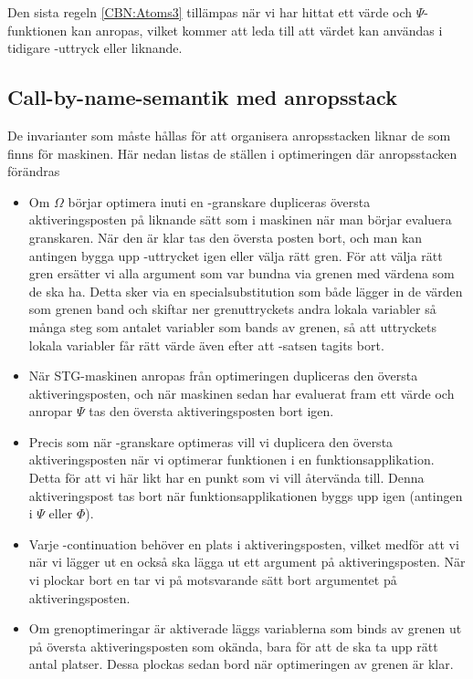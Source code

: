 \documentclass[../Optimise]{subfiles}
\begin{document}
Den sista regeln \eqref{CBN:Atoms3} tillämpas när vi har hittat ett värde och $\Psi$-funktionen kan anropas,
vilket kommer att leda till att värdet kan användas i tidigare -uttryck eller liknande.


\subsection{Call-by-name-semantik med anropsstack}


De invarianter som måste hållas för att organisera anropsstacken liknar de som finns
för maskinen. Här nedan listas de ställen i optimeringen där anropsstacken förändras



\begin{itemize}
\item
Om $\Omega$ börjar optimera inuti en -granskare dupliceras översta aktiveringsposten 
på liknande sätt som i maskinen när man börjar evaluera granskaren. När den är klar
tas den översta posten bort, och man kan antingen bygga upp -uttrycket igen
eller välja rätt gren. För att välja rätt gren ersätter vi alla argument som var
bundna via grenen med värdena som de ska ha. Detta sker via en specialsubstitution 
som både lägger in de värden som grenen band och skiftar ner grenuttryckets andra lokala 
variabler så många steg som antalet variabler som bands av grenen, så att uttryckets
lokala variabler får rätt värde även efter att -satsen tagits bort.

\item
När STG-maskinen anropas från optimeringen dupliceras den översta aktiveringsposten,
och när maskinen sedan har evaluerat fram ett värde och anropar $\Psi$ tas den översta aktiveringsposten bort igen.

\item
Precis som när -granskare optimeras vill vi duplicera den översta aktiveringsposten när vi 
optimerar funktionen i en funktionsapplikation. Detta för att vi här likt 
har en punkt som vi vill återvända till. Denna aktiveringspost tas bort när 
funktionsapplikationen byggs upp igen (antingen i $\Psi$ eller $\Phi$). 

\item
Varje -continuation behöver en plats i aktiveringsposten, vilket medför
att vi när vi lägger ut en  också ska lägga ut ett argument på aktiveringsposten.
När vi plockar bort en  tar vi på motsvarande sätt bort argumentet på aktiveringsposten.

\item
Om grenoptimeringar är aktiverade läggs variablerna som binds av grenen ut på
översta aktiveringsposten som okända, bara för att de ska ta upp rätt antal platser.
Dessa plockas sedan bord när optimeringen av grenen är klar. 


\end{itemize}
\end{document}
